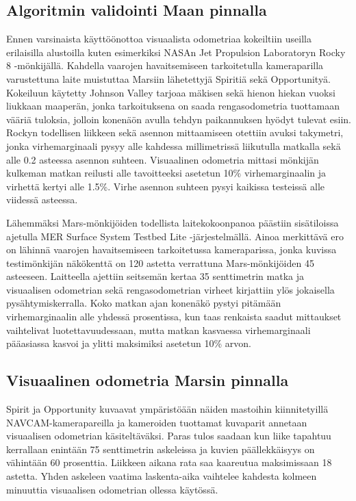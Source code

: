 \documentclass[finnish]{tktltiki2}
\theoremstyle{definition}
\theoremstyle{remark}
\begin{document}
\cite{cheng2005visual}

\subsection{Algoritmin validointi Maan pinnalla}
Ennen varsinaista käyttöönottoa visuaalista odometriaa kokeiltiin useilla erilaisilla alustoilla kuten esimerkiksi NASAn Jet Propulsion Laboratoryn Rocky 8 -mönkijällä. Kahdella vaarojen havaitsemiseen tarkoitetulla kameraparilla varustettuna laite muistuttaa Marsiin lähetettyjä Spiritiä sekä Opportunityä. Kokeiluun käytetty Johnson Valley tarjoaa mäkisen sekä hienon hiekan vuoksi liukkaan maaperän, jonka tarkoituksena on saada rengasodometria tuottamaan vääriä tuloksia, jolloin konenäön avulla tehdyn paikannuksen hyödyt tulevat esiin. Rockyn todellisen liikkeen sekä asennon mittaamiseen otettiin avuksi takymetri, jonka virhemarginaali pysyy alle kahdessa millimetrissä liikutulla matkalla sekä alle 0.2 asteessa asennon suhteen. Visuaalinen odometria mittasi mönkijän kulkeman matkan reilusti alle tavoitteeksi asetetun 10\% virhemarginaalin ja virhettä kertyi alle 1.5\%. Virhe asennon suhteen pysyi kaikissa testeissä alle viidessä asteessa.

Lähemmäksi Mars-mönkijöiden todellista laitekokoonpanoa päästiin sisätiloissa ajetulla MER Surface System Testbed Lite -järjestelmällä. Ainoa merkittävä ero on lähinnä vaarojen havaitsemiseen tarkoitetussa kameraparissa, jonka kuvissa testimönkijän näkökenttä on 120 astetta verrattuna Mars-mönkijöiden 45 asteeseen. Laitteella ajettiin seitsemän kertaa 35 senttimetrin matka ja visuaalisen odometrian sekä rengasodometrian virheet kirjattiin ylös jokaisella pysähtymiskerralla. Koko matkan ajan konenäkö pystyi pitämään virhemarginaalin alle yhdessä prosentissa, kun taas renkaista saadut mittaukset vaihtelivat luotettavuudessaan, mutta matkan kasvaessa virhemarginaali pääasiassa kasvoi ja ylitti maksimiksi asetetun 10\% arvon. \cite{cheng2005visual}

\subsection{Visuaalinen odometria Marsin pinnalla}
Spirit ja Opportunity kuvaavat ympäristöään näiden mastoihin kiinnitetyillä NAVCAM-kamerapareilla ja kameroiden tuottamat kuvaparit annetaan visuaalisen odometrian käsiteltäväksi. Paras tulos saadaan kun liike tapahtuu kerrallaan enintään 75 senttimetrin askeleissa ja kuvien päällekkäisyys on vähintään 60 prosenttia. Liikkeen aikana rata saa kaareutua maksimissaan 18 astetta. Yhden askeleen vaatima laskenta-aika vaihtelee kahdesta kolmeen minuuttia visuaalisen odometrian ollessa käytössä.
\end{document}
